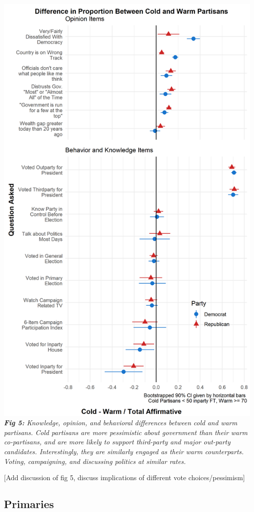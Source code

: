 \documentclass[
  12,
]{paper}
\begin{document}
\includegraphics{fig/gg-pooled-combined-strict.png} \emph{\textbf{Fig
5:} Knowledge, opinion, and behavioral differences between cold and warm
partisans. Cold partisans are more pessimistic about government than
their warm co-partisans, and are more likely to support third-party and
major out-party candidates. Interestingly, they are similarly engaged as
their warm counterparts. Voting, campaigning, and discussing politics at
similar rates.}

{[}Add discussion of fig 5, discuss implications of different vote
choices/pessimism{]}

\hypertarget{primaries}{%
\subsection{Primaries}\label{primaries}}
\end{document}

